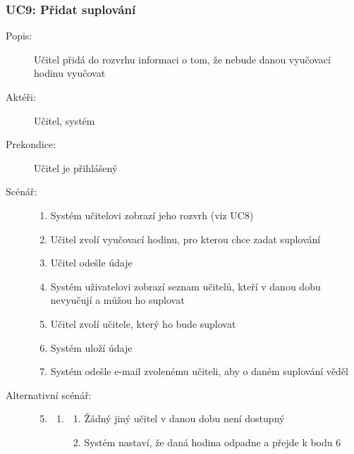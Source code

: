 \documentclass[a4paper,10pt,titlepage]{article}
\begin{document}
	\subsubsection*{UC9: Přidat suplování}
	\begin{description}
		\item[Popis:] Učitel přidá do rozvrhu informaci o tom, že nebude danou vyučovací hodinu vyučovat
		\item[Aktéři:] Učitel, systém
		\item[Prekondice:] Učitel je přihlášený
		\item[Scénář:] \hfill
				\begin{enumerate}
					\item Systém učitelovi zobrazí jeho rozvrh (viz UC8)
					\item Učitel zvolí vyučovací hodinu, pro kterou chce zadat suplování
					\item Učitel odešle údaje
					\item Systém uživatelovi zobrazí seznam učitelů, kteří v danou dobu nevyučují a můžou ho suplovat
					\item Učitel zvolí učitele, který ho bude suplovat
					\item Systém uloží údaje
					\item Systém odešle e-mail zvolenému učiteli, aby o daném suplování věděl
				\end{enumerate}
		\item[Alternativní scénář:] \hfill
				\begin{enumerate}
					\setcounter{enumi}{4}
					\setcounter{enumii}{1}
					\item \begin{enumerate}[label*=\arabic*.,leftmargin=8pt]
						\item
							\begin{enumerate}[label=\alph*.]
								\item Žádný jiný učitel v danou dobu není dostupný
								\item Systém nastaví, že daná hodina odpadne a přejde k bodu 6
							\end{enumerate}
					\end{enumerate}		
				\end{enumerate}
	\end{description}
\end{document}
